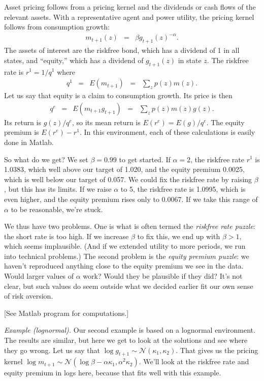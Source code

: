 \documentclass[11pt]{article}
\begin{document}
Asset pricing follows from a pricing kernel and the dividends or cash flows
of the relevant assets.
With a representative agent and power utility, the pricing kernel follows
from consumption growth:
\begin{eqnarray*}
    m_{t+1} (z) &=& \beta g_{t+1}(z)^{-\alpha} .
\end{eqnarray*}
The assets of interest are the riskfree bond, which has a dividend of 1 in all states,
and ``equity,'' which has a dividend of $g_{t+1}(z)$ in state $z$.
The riskfree rate is $r^1 = 1/q^1$ where
\begin{eqnarray*}
    q^1 &=& E (m_{t+1} )  \;\;=\;\; \sum_z p(z) m(z) .
\end{eqnarray*}
Let us say that equity is a claim to consumption growth.
Its price is then
\begin{eqnarray*}
    q^e &=& E (m_{t+1} g_{t+1} )  \;\;=\;\; \sum_z p(z) m(z) g(z) .
\end{eqnarray*}
Its return is $ g(z)/q^e$, so its mean return is $E(r^e) = E (g)/q^e$.
The equity premium is $ E(r^e) - r^1$.
In this environment, each of these calculations is easily done in Matlab.

So what do we get?
We set $\beta = 0.99$ to get started.
If $\alpha = 2$, the riskfree rate $r^1$ is 1.0383, which well above our target of 1.020,
and the equity premium 0.0025, which is well below our target of 0.057.
We could fix the riskfree rate by raising $\beta$,
but this has its limits.
If we raise $\alpha$ to 5, the riskfree rate is 1.0995,
which is even higher,
and the equity premium rises only to 0.0067.
If we take this range of $\alpha$ to be reasonable, we're stuck.

We thus have two problems.
One is what is often termed the {\it riskfree rate puzzle\/}:
the short rate is too high.
If we increase $\beta$ to fix this, we end up with $\beta>1$,
which seems implausible.
(And if we extended utility to more periods, we run into technical problems.)
The second problem is the {\it equity premium puzzle\/}:
we haven't reproduced anything close to the equity premium we see in the data.
Would larger values of $\alpha$ work?  Would they be plausible if they did?
It's not clear, but such values do seem outside what we decided earlier
fit our own sense of risk aversion.

[See Matlab program for computations.]


{\it Example (lognormal).}
Our second example is based on a lognormal environment.
The results are similar, but here we get to look at the solutions
and see where they go wrong.
Let us say that $\log g_{t+1} \sim \mathcal{N}(\kappa_1, \kappa_2)$.
That gives us the pricing kernel
$\log m_{t+1} \sim \mathcal{N}(\log \beta - \alpha \kappa_1, \alpha^2 \kappa_2)$.
We'll look at the riskfree rate and equity premium in logs here,
because that fits well with this example.
\end{document}
